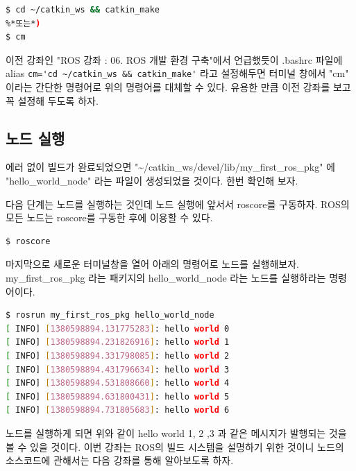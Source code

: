 \begin{lstlisting}[language=bash]
$ cd ~/catkin_ws && catkin_make
%*또는*)
$ cm
\end{lstlisting}

\noindent
이전 강좌인 "ROS 강좌 : 06. ROS 개발 환경 구축"에서 언급했듯이 .bashrc 파일에 alias \verb|cm='cd ~/catkin_ws && catkin_make'| 라고 설정해두면 터미널 창에서 "cm" 이라는 간단한 명령어로 위의 명령어를 대체할 수 있다. 유용한 만큼 이전 강좌를 보고 꼭 설정해 두도록 하자.

\subsection{노드 실행}

에러 없이 빌드가 완료되었으면 "\textasciitilde/catkin\_ws/devel/lib/my\_first\_ros\_pkg" 에 "hello\_world\_node" 라는 파일이 생성되었을 것이다. 한번 확인해 보자.

다음 단계는 노드를 실행하는 것인데 노드 실행에 앞서서 roscore를 구동하자. ROS의 모든 노드는 roscore를 구동한 후에 이용할 수 있다.

\begin{lstlisting}[language=bash]
$ roscore
\end{lstlisting}

\noindent
마지막으로 새로운 터미널창을 열어 아래의 명령어로 노드를 실행해보자. my\_first\_ros\_pkg 라는 패키지의 hello\_world\_node 라는 노드를 실행하라는 명령어이다.

\begin{lstlisting}[language=bash]
$ rosrun my_first_ros_pkg hello_world_node 
[ INFO] [1380598894.131775283]: hello world 0
[ INFO] [1380598894.231826916]: hello world 1
[ INFO] [1380598894.331798085]: hello world 2
[ INFO] [1380598894.431796634]: hello world 3
[ INFO] [1380598894.531808660]: hello world 4
[ INFO] [1380598894.631800431]: hello world 5
[ INFO] [1380598894.731805683]: hello world 6
\end{lstlisting}

\noindent
노드를 실행하게 되면 위와 같이 hello world 1, 2 ,3 과 같은 메시지가 발행되는 것을 볼 수 있을 것이다. 이번 강좌는 ROS의 빌드 시스템을 설명하기 위한 것이니 노드의 소스코드에 관해서는 다음 강좌를 통해 알아보도록 하자.


